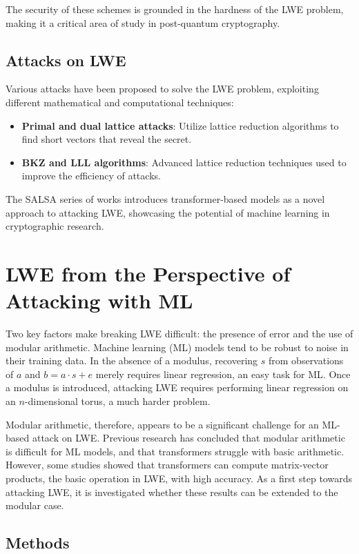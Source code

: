 \documentclass{article}
\begin{document}
The security of these schemes is grounded in the hardness of the LWE problem, making it a critical area of study in post-quantum cryptography.

\subsection{Attacks on LWE}
Various attacks have been proposed to solve the LWE problem, exploiting different mathematical and computational techniques:
\begin{itemize}
    \item \textbf{Primal and dual lattice attacks}: Utilize lattice reduction algorithms to find short vectors that reveal the secret.
    \item \textbf{BKZ and LLL algorithms}: Advanced lattice reduction techniques used to improve the efficiency of attacks.
\end{itemize}

The SALSA series of works introduces transformer-based models as a novel approach to attacking LWE, showcasing the potential of machine learning in cryptographic research.

\section{LWE from the Perspective of Attacking with ML}

Two key factors make breaking LWE difficult: the presence of error and the use of modular arithmetic. Machine learning (ML) models tend to be robust to noise in their training data. In the absence of a modulus, recovering \( s \) from observations of \( a \) and \( b = a \cdot s + e \) merely requires linear regression, an easy task for ML. Once a modulus is introduced, attacking LWE requires performing linear regression on an \( n \)-dimensional torus, a much harder problem.

Modular arithmetic, therefore, appears to be a significant challenge for an ML-based attack on LWE. Previous research has concluded that modular arithmetic is difficult for ML models, and that transformers struggle with basic arithmetic. However, some studies showed that transformers can compute matrix-vector products, the basic operation in LWE, with high accuracy. As a first step towards attacking LWE, it is investigated whether these results can be extended to the modular case.

\subsection{Methods}
\end{document}
